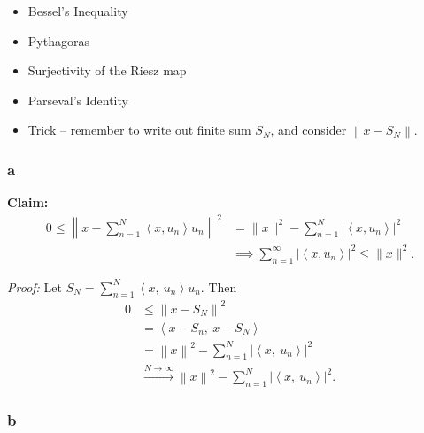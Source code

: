 \begin{solution}

\hfill

\begin{concept}

\hfill

\begin{itemize}
\tightlist
\item
  Bessel's Inequality
\item
  Pythagoras
\item
  Surjectivity of the Riesz map
\item
  Parseval's Identity
\item
  Trick -- remember to write out finite sum \(S_N\), and consider
  \({\left\lVert {x - S_N} \right\rVert}\).
\end{itemize}

\end{concept}

\hypertarget{a-15}{%
\subsubsection{a}\label{a-15}}

\textbf{Claim:}
\begin{align*}
0 \leq \left\|x-\sum_{n=1}^{N}\left\langle x, u_{n}\right\rangle u_{n}\right\|^{2}
&= \|x\|^{2}-\sum_{n=1}^{N}\left|\left\langle x, u_{n}\right\rangle\right|^{2} \\ 
&\implies
\sum_{n=1}^{\infty}\left|\left\langle x, u_{n}\right\rangle\right|^{2} \leq\|x\|^{2}
.\end{align*}

\emph{Proof:} Let
\(S_N = \sum_{n=1}^N {\left\langle {x},~{u_n} \right\rangle} u_n\). Then
\begin{align*}
0 
&\leq {\left\lVert {x - S_N} \right\rVert}^2 \\ 
&= {\left\langle {x - S_n},~{x - S_N} \right\rangle} \\
&= {\left\lVert {x} \right\rVert}^2 - \sum_{n=1}^N {\left\lvert {{\left\langle {x},~{u_n} \right\rangle}} \right\rvert}^2 \\
&\xrightarrow{N\to\infty} {\left\lVert {x} \right\rVert}^2 - \sum_{n=1}^N {\left\lvert {{\left\langle {x},~{u_n} \right\rangle}} \right\rvert}^2
.\end{align*}

\hypertarget{b-14}{%
\subsubsection{b}\label{b-14}}


\end{solution}
